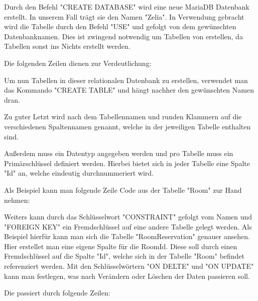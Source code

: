 

Durch den Befehl "CREATE DATABASE" wird eine neue MariaDB Datenbank erstellt. In unserem Fall trägt sie den Namen "Zelia". In Verwendung gebracht wird die Tabelle durch den Befehl "USE" und gefolgt von dem gewünschten Datenbanknamen. Dies ist zwingend notwendig um Tabellen von erstellen, da Tabellen sonst ins Nichts erstellt werden.

Die folgenden Zeilen dienen zur Verdeutlichung:


Um nun Tabellen in dieser relationalen Datenbank zu erstellen, verwendet man das Kommando "CREATE TABLE" und hängt nachher den gewünschten Namen dran.

Zu guter Letzt wird nach dem Tabellennamen und runden Klammern auf die verschiedenen Spaltennamen genannt, welche in der jeweiligen Tabelle enthalten sind.

Außerdem muss ein Datentyp angegeben werden und pro Tabelle muss ein Primärschlüssel definiert werden. Hierbei bietet sich in jeder Tabelle eine Spalte "Id" an, welche eindeutig durchnummeriert wird.

Als Beispiel kann man folgende Zeile Code aus der Tabelle "Room" zur Hand nehmen:


Weiters kann durch das Schlüsselwort "CONSTRAINT" gefolgt vom Namen und "FOREIGN KEY" ein Fremdschlüssel auf eine andere Tabelle gelegt werden. Als Beispiel hierfür kann man sich die Tabelle "RoomReservation" genauer ansehen. Hier erstellet man eine eigene Spalte für die RoomId. Diese soll durch einen Fremdschlüssel auf die Spalte "Id", welche sich in der Tabelle "Room" befindet referenziert werden. Mit den Schlüsselwörtern "ON DELTE" und "ON UPDATE" kann man festlegen, was nach Verändern oder Löschen der Daten passieren soll.

Die passiert durch folgende Zeilen:

